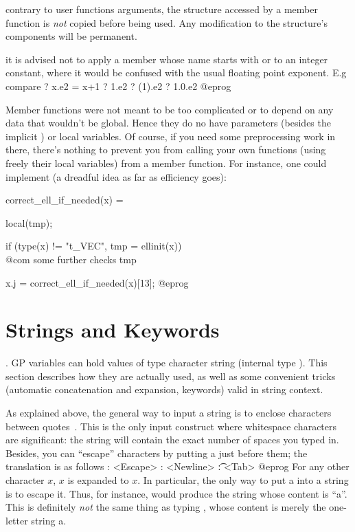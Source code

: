  contrary to user functions arguments, the structure
accessed by a member function is \emph{not} copied before being used.
Any modification to the structure's components will be permanent.

 it is advised not to apply a member whose name
starts with  or  to an integer constant, where it would be
confused with the usual floating point exponent. E.g compare
\bprog
  ? x.e2 = x+1
  ? 1.e2
  ? (1).e2
  ? 1.0.e2
@eprog

 Member functions were not meant to be too complicated or to
depend on any data that wouldn't be global. Hence they do no have parameters
(besides the implicit ) or local variables. Of course, if you
need some preprocessing work in there, there's nothing to prevent you from
calling your own functions (using freely their local variables) from a member
function. For instance, one could implement (a dreadful idea as far as
efficiency goes):

\bprog
correct_ell_if_needed(x) =
{ local(tmp);

  if (type(x) != "t_VEC", tmp = ellinit(x))
    \\ @com some further checks
  tmp
}
x.j = correct_ell_if_needed(x)[13];
@eprog

\section{Strings and Keywords}
\label{se:strings}

. GP variables can hold values of type character string
(internal type ). This section describes how they are actually used,
as well as some convenient tricks (automatic concatenation and expansion,
keywords) valid in string context.

As explained above, the general way to input a string is to enclose
characters between quotes~. This is the only input construct where
whitespace characters are significant: the string will contain the exact
number of spaces you typed in. Besides, you can ``escape'' characters by
putting a \kbd{\bs} just before them; the translation is as follows
\bprog
   \e: <Escape>
   \n: <Newline>
   \t: <Tab>
@eprog
For any other character $x$, \b{$x$} is expanded to $x$. In particular, the
only way to put a  into a string is to escape it. Thus, for
instance,  would produce the string whose content is
``a''. This is definitely \emph{not} the same thing as typing ,
whose content is merely the one-letter string a.

